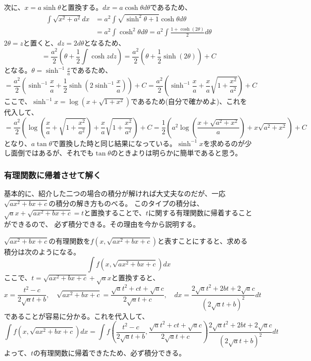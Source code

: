 \documentclass[a4j,dvipdfmx]{jsarticle}
\begin{document}
次に、$x=a\sinh \theta$と置換する。$dx=a\cosh\theta d\theta$であるため、
\begin{align*}
    \int\sqrt{x^2+a^2}dx&=a^2\int\sqrt{\sinh^2\theta+1}\cosh\theta d\theta\\
    &=a^2\int \cosh^2 \theta d\theta=a^2\int\frac{1+\cosh(2\theta)}{2}d\theta
\end{align*}
$2\theta=z$と置くと、$dz=2d\theta$となるため、
\begin{equation*}
    =\frac{a^2}{2}(\theta+\frac{1}{2}\int \cosh zdz)=\frac{a^2}{2}(\theta+\frac{1}{2}\sinh(2\theta))+C
\end{equation*}
となる。$\theta=\sinh^{-1}\frac{x}{a}$であるため、
\begin{equation*}
    =\frac{a^2}{2}(\sinh^{-1}\frac{x}{a}+\frac{1}{2}\sinh(2\sinh^{-1}\frac{x}{a}))+C
    =\frac{a^2}{2}(\sinh^{-1}\frac{x}{a}+\frac{x}{a}\sqrt{1+\frac{x^2}{a^2}})+C
\end{equation*}
ここで、$\sinh^{-1}x=\log(x+\sqrt{1+x^2})$であるため(自分で確かめよ)、これを代入して、
\begin{equation*}
    =\frac{a^2}{2}\left(\log\left(\frac{x}{a}+\sqrt{1+\frac{x^2}{a^2}}\right)+\frac{x}{a}\sqrt{1+\frac{x^2}{a^2}}\right)+C=\frac{1}{2}\left(a^2\log\left(\frac{x+\sqrt{a^2+x^2}}{a}\right)+x\sqrt{a^2+x^2}\right)+C
\end{equation*}
となり、$a\tan\theta$で置換した時と同じ結果になっている。$\sinh^{-1}x$を求めるのが少し面倒ではあるが、それでも$\tan \theta$のときよりは明らかに簡単であると思う。
\newpage
\subsubsection{有理関数に帰着させて解く}
基本的に、紹介した二つの場合の積分が解ければ大丈夫なのだが、一応$\sqrt{ax^2+bx+c}$の積分の解き方ものべる。
このタイプの積分は、$\sqrt{a}x+\sqrt{ax^2+bx+c}=t$と置換することで、$t$に関する有理関数に帰着することができるので、
必ず積分できる。その理由を今から説明する。

$\sqrt{ax^2+bx+c}$の有理関数を$f(x,\sqrt{ax^2+bx+c})$と表すことにすると、求める積分は次のようになる。
\begin{equation*}
    \int f(x,\sqrt{ax^2+bx+c})dx
\end{equation*}
ここで、$t=\sqrt{ax^2+bx+c}+\sqrt{a}x$と置換すると、
\begin{equation*}
    x=\frac{t^2-c}{2\sqrt{a}t+b},\quad\sqrt{ax^2+bx+c}=\frac{\sqrt{a}t^2+ct+\sqrt{a}c}{2\sqrt{a}t+c},\quad dx=\frac{2\sqrt{a}t^2+2bt+2\sqrt{a}c}{(2\sqrt{a}t+b)^2}dt
\end{equation*}
であることが容易に分かる。これを代入して、
\begin{equation*}
    \int f(x,\sqrt{ax^2+bx+c})dx=\int f(\frac{t^2-c}{2\sqrt{a}t+b},\frac{\sqrt{a}t^2+ct+\sqrt{a}c}{2\sqrt{a}t+c})\frac{2\sqrt{a}t^2+2bt+2\sqrt{a}c}{(2\sqrt{a}t+b)^2}dt
\end{equation*}
よって、$t$の有理関数に帰着できたため、必ず積分できる。
\end{document}
